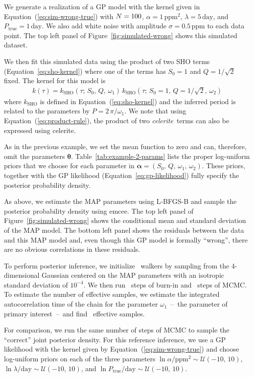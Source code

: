 \documentclass[manuscript, letterpaper]{aastex6}
\newcommand{\project}[1]{\textsf{#1}}
\newcommand{\celerite}{\project{celerite}}
\newcommand{\celeriteterm}{\emph{celerite}}
\newcommand{\emcee}{\project{emcee}}
\newcommand{\figureref}[1]{\ref{fig:#1}}
\newcommand{\Figure}[1]{Figure~\figureref{#1}}
\renewcommand{\eqref}[1]{\ref{eq:#1}}
\newcommand{\Eq}[1]{Equation~(\eqref{#1})}
\newcommand{\eq}[1]{\Eq{#1}}
\newcommand{\eqalt}[1]{Equation~\eqref{#1}}
\newcommand{\bvec}[1]{{\ensuremath{\boldsymbol{#1}}}}
\newcommand{\response}[1]{{\color{blue}#1}}
\begin{document}
\response{We generate a realization of a GP model with the kernel given in
\eq{sim-wrong-true} with $N = 100$, $\alpha = 1\,\mathrm{ppm}^2$,
$\lambda = 5\,\mathrm{day}$, and $P_\mathrm{true} = 1\,\mathrm{day}$.
We also add white noise with amplitude $\sigma = 0.5\,\mathrm{ppm}$ to each
data point.
The top left panel of \Figure{simulated-wrong} shows this simulated dataset.

We then fit this simulated data using the product of two SHO terms
(\eqalt{sho-kernel}) where one of the terms has $S_0 = 1$ and $Q =
1/\sqrt{2}$ fixed.
The kernel for this model is
\begin{eqnarray}
k(\tau) = k_\mathrm{SHO}(\tau;\,S_0,\,Q,\,\omega_1) \,
    k_\mathrm{SHO}(\tau;\,S_0 = 1,\,Q = 1/\sqrt{2},\,\omega_2)
\end{eqnarray}
where $k_\mathrm{SHO}$ is defined in \eq{sho-kernel} and the inferred period
is related to the parameters by $P=2\,\pi/\omega_1$.
We note that using \eq{product-rule}, the product of two \celeriteterm\ terms
can also be expressed using \celerite.

As in the previous example, we set the mean function to zero and can,
therefore, omit the parameters $\bvec{\theta}$.
Table~\ref{tab:example-2-params} lists the proper log-uniform priors that we
choose for each parameter in $\bvec{\alpha} =
(S_0,\,Q,\,\omega_1,\,\omega_2)$.
These priors, together with the GP likelihood (\eqalt{gp-likelihood}) fully
specify the posterior probability density.

As above, we estimate the MAP parameters using \project{L-BFGS-B} and sample
the posterior probability density using \emcee.
The top left panel of \Figure{simulated-wrong} shows the conditional mean and
standard deviation of the MAP model.
The bottom left panel shows the residuals between the data and this MAP model
and, even though this GP model is formally ``wrong'', there are no obvious
correlations in these residuals.

To perform posterior inference, we initialize \exampleiinwalkers~walkers by
sampling from the 4-dimensional Gaussian centered on the MAP parameters with
an isotropic standard deviation of $10^{-4}$.
We then run \exampleiinburn~steps of burn-in and \exampleiinsteps~steps of
MCMC.
To estimate the number of effective samples, we estimate the integrated
autocorrelation time of the chain for the parameter $\omega_1$~--~the
parameter of primary interest~--~and find \exampleiineff~effective samples.

For comparison, we run the same number of steps of MCMC to sample the
``correct'' joint posterior density.
For this reference inference, we use a GP likelihood with the kernel given by
\eq{sim-wrong-true} and choose log-uniform priors on each of the
three parameters $\ln \alpha/\mathrm{ppm}^2 \sim \mathcal{U}(-10,\,10)$,
$\ln \lambda/\mathrm{day} \sim \mathcal{U}(-10,\,10)$, and
$\ln P_\mathrm{true}/\mathrm{day} \sim \mathcal{U}(-10,\,10)$.

}
\end{document}
